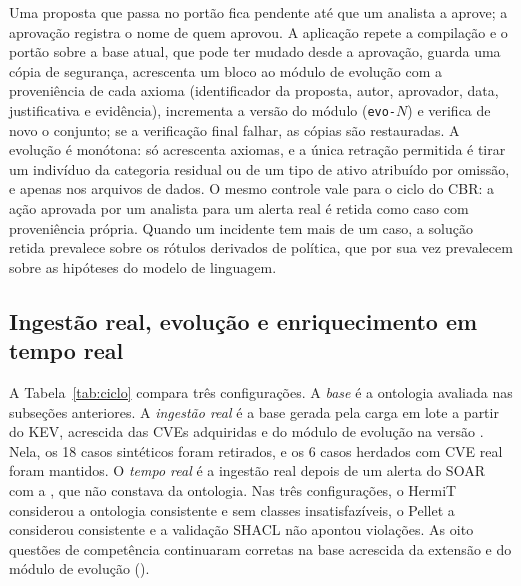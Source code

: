 Uma proposta que passa no portão fica pendente até que um analista a aprove; a aprovação registra o nome de quem aprovou. A aplicação repete a compilação e o portão sobre a base atual, que pode ter mudado desde a aprovação, guarda uma cópia de segurança, acrescenta um bloco ao módulo de evolução com a proveniência de cada axioma (identificador da proposta, autor, aprovador, data, justificativa e evidência), incrementa a versão do módulo (\texttt{evo-$N$}) e verifica de novo o conjunto; se a verificação final falhar, as cópias são restauradas. A evolução é monótona: só acrescenta axiomas, e a única retração permitida é tirar um indivíduo da categoria residual ou de um tipo de ativo atribuído por omissão, e apenas nos arquivos de dados. O mesmo controle vale para o ciclo do CBR: a ação aprovada por um analista para um alerta real é retida como caso com proveniência própria. Quando um incidente tem mais de um caso, a solução retida prevalece sobre os rótulos derivados de política, que por sua vez prevalecem sobre as hipóteses do modelo de linguagem.


\subsection{Ingestão real, evolução e enriquecimento em tempo real}
\label{sec:res-ciclo}

A Tabela~\ref{tab:ciclo} compara três configurações. A \emph{base} é a ontologia avaliada nas subseções anteriores. A \emph{ingestão real} é a base gerada pela carga em lote a partir do KEV, acrescida das CVEs adquiridas e do módulo de evolução na versão \lcEvoVersion{}. Nela, os 18 casos sintéticos foram retirados, e os 6 casos herdados com CVE real foram mantidos. O \emph{tempo real} é a ingestão real depois de um alerta do SOAR com a \lcCve{}, que não constava da ontologia. Nas três configurações, o HermiT considerou a ontologia consistente e sem classes insatisfazíveis, o Pellet a considerou consistente e a validação SHACL não apontou violações. As oito questões de competência continuaram corretas na base acrescida da extensão e do módulo de evolução (\lcRegressionCq{}).

\begin{table}[ht]
\centering\small
\caption{Ontologia base, após a ingestão real e após um alerta com enriquecimento em tempo real. Na base, o SHACL usa as restrições da Seção~\ref{sec:res}; nas outras colunas, também as de ingestão e de evolução. Tempos de uma única execução, incluindo o arranque da máquina virtual Java.}
\label{tab:ciclo}

\end{table}

